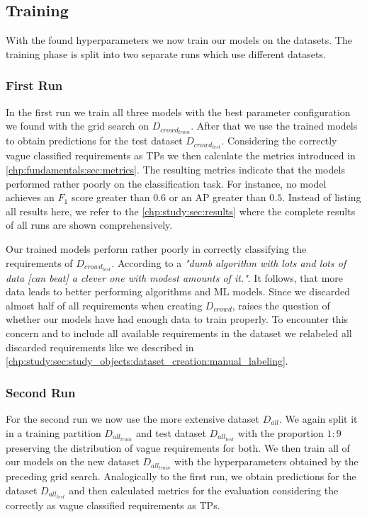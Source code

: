 \subsection{Training}
\label{chp:study:sec:execution:subsec:training}
With the found hyperparameters we now train our models on the datasets.
The training phase is split into two separate runs which use different datasets.

\subsubsection{First Run}
\label{chp:study:sec:execution:subsec:training:first_run}
In the first run we train all three models with the best parameter configuration we found with the grid search on $D_{crowd_{train}}$.
After that we use the trained models to obtain predictions for the test dataset $D_{crowd_{test}}$.
Considering the correctly vague classified requirements as \acp{TP} we then calculate the metrics introduced in \cref{chp:fundamentals:sec:metrics}.
The resulting metrics indicate that the models performed rather poorly on the classification task.
For instance, no model achieves an $F_1$ score greater than $0.6$ or an \ac{AP} greater than $0.5$.
Instead of listing all results here, we refer to the \cref{chp:study:sec:results} where the complete results of all runs are shown comprehensively.

Our trained models perform rather poorly in correctly classifying the requirements of $D_{crowd_{test}}$.
According to \textcite{Domingos:2012} a \textit{"dumb algorithm with lots and lots of data [can beat] a clever one with modest amounts of it."}.
It follows, that more data leads to better performing algorithms and \ac{ML} models.
Since we discarded almost half of all requirements when creating $D_{crowd}$, raises the question of whether our models have had enough data to train properly.
To encounter this concern and to include all available requirements in the dataset we relabeled all discarded requirements like we described in \cref{chp:study:sec:study_objects:dataset_creation:manual_labeling}.

\subsubsection{Second Run}
\label{chp:study:sec:execution:subsec:training:second_run}

For the second run we now use the more extensive dataset $D_{all}$.
We again split it in a training partition $D_{all_{train}}$ and test dataset $D_{all_{test}}$ with the proportion $1\mathrm{:}9$ preserving the distribution of vague requirements for both.
We then train all of our models on the new dataset $D_{all_{train}}$ with the hyperparameters obtained by the preceding grid search.
Analogically to the first run, we obtain predictions for the dataset $D_{all_{test}}$ and then calculated metrics for the evaluation considering the correctly as vague classified requirements as \acp{TP}.
